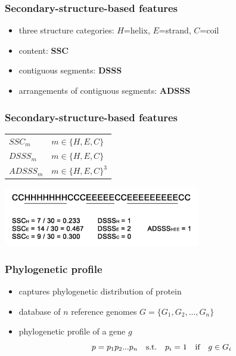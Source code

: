 \documentclass{beamer}
\begin{document}
\begin{frame}
  \frametitle{Secondary-structure-based features}
  \begin{itemize}
    \item three structure categories: $H$=helix, $E$=strand, $C$=coil
    \item content: \textbf{SSC}
    \item contiguous segments: \textbf{DSSS}
    \item arrangements of contiguous segments: \textbf{ADSSS}
  \end{itemize}
\end{frame}
\begin{frame}
  \frametitle{Secondary-structure-based features}
  \begin{table} \centering
  \begin{tabular}{ l l } \hline
    $SSC_m$ & $m \in \{H, E, C\}$ \\
    $DSSS_m$ & $m \in \{H, E, C\}$ \\
    $ADSSS_{m}$ \hspace{15px} & $m \in \{H, E, C\}^{3}$ \\ \hline
  \end{tabular}
  \vspace{5px}
\end{table}
  \begin{center}
    \includegraphics[width=325px]{../ss.png}
  \end{center}
\end{frame}
\begin{frame}
  \frametitle{Phylogenetic profile}
  \begin{itemize}
    \item captures phylogenetic distribution of protein
    \item database of $n$ reference genomes $G = \{ G_1, G_2, ..., G_n \}$
    \item phylogenetic profile of a gene $g$ \[ p = p_1 p_2 ... p_n \hspace{10px}\text{s.t.}\hspace{10px} p_i = 1 \hspace{10px}\text{if}\hspace{10px} g \in G_i \]
  \end{itemize}
\end{frame}
\end{document}
